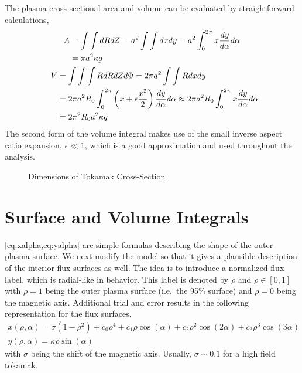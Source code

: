 The plasma cross-sectional area and volume can be evaluated by straightforward calculations,
\begin{gather}
\begin{split}
	A & = \int \int dR dZ = a^2 \int \int dx dy = a^2 \int_0^{2 \pi} x \frac{dy}{d\alpha} d\alpha \\ & = \pi a^2 \kappa g
\end{split} \\
\begin{split}
	\volume & = \int \int \int R dR dZ d\Phi = 2 \pi a^2 \int \int R dx dy \\ & = 2 \pi a^2 R_0 \int_0^{2 \pi} \left( x + \epsilon \frac{ x^2 }{ 2} \right) \frac{dy}{d\alpha} d\alpha \approx 2 \pi a^2 R_0 \int_0^{2 \pi} x \frac{dy}{d\alpha} d\alpha \\ & = 2 \pi^2 R_0 a^2 \kappa g
\end{split}
\end{gather}
The second form of the volume integral makes use of the small inverse aspect ratio expansion, $\epsilon \ll 1 $, which is a good approximation and used throughout the analysis.

\begin{figure*}[b]
\centering
\begin{adjustbox}{width=0.6\textwidth}
  \large
  
\end{adjustbox}
\caption{Dimensions of Tokamak Cross-Section}
\label{fig:dims}
\end{figure*}

\section{Surface and Volume Integrals}

\cref{eq:xalpha,eq:yalpha} are simple formulas describing the shape of the outer plasma surface. We next modify the model so that it gives a plausible description of the interior flux surfaces as well. The idea is to introduce a normalized flux label, which is radial-like in behavior. This label is denoted by $\rho$ and $\rho \in [0,1]$ with $\rho = 1$ being the outer plasma surface (i.e.\ the 95\% surface) and $\rho = 0$ being the magnetic axis. Additional trial and error results in the following representation for the flux surfaces,
\begin{gather}
	x(\rho,\alpha) = \sigma( 1 - \rho^2 ) + c_0 \rho^4 + c_1 \rho \cos(\alpha) + c_2 \rho^2 \cos(2\alpha) +
		c_3 \rho^3 \cos(3\alpha) \\
	y(\rho, \alpha) = \kappa \rho \sin(\alpha)
\end{gather}
with $\sigma$ being the shift of the magnetic axis. Usually, $\sigma \sim 0.1$ for a high field tokamak.


